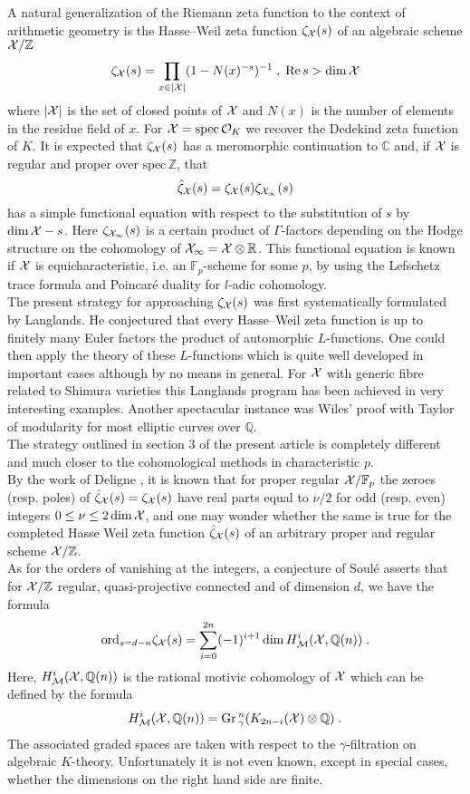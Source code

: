 \documentclass[11pt,leqno]{article}
\newcommand{\C}{{\mathbb{C}}}
\newcommand{\F}{{\mathbb{F}}}
\newcommand{\Q}{{\mathbb{Q}}}
\newcommand{\R}{{\mathbb{R}}}
\newcommand{\Z}{{\mathbb{Z}}}
\newcommand{\ord}{\mathrm{ord}}
\newcommand{\spec}{\mathrm{spec}\,}
\newcommand{\Gr}{\mathrm{Gr}\,}
\newcommand{\RRe}{\mathrm{Re}\,}
\newcommand{\Mh}{{\cal M}}
\newcommand{\Oh}{\mathcal{O}}
\newcommand{\eX}{{\cal X}}
\begin{document}
A natural generalization of the Riemann zeta function to the context of arithmetic geometry is the Hasse--Weil zeta function $\zeta_{\eX} (s)$ of an algebraic scheme $\eX / \Z$
\[
\zeta_{\eX} (s) = \prod_{x \in |\eX|} (1 - N (x)^{-s} )^{-1} \; , \; \RRe s > \dim \eX
\]
where $|\eX |$ is the set of closed points of $\eX$ and $N (x)$ is the number of elements in the residue field of $x$. For $\eX = \spec \Oh_K$ we recover the Dedekind zeta function of $K$. It is expected that $\zeta_{\eX} (s)$ has a meromorphic continuation to $\C$ and, if $\eX$ is regular and proper over $\spec \Z$, that
\[
\hat{\zeta}_{\eX} (s) = \zeta_{\eX} (s) \zeta_{\eX_{\infty}} (s)
\]
has a simple functional equation with respect to the substitution of $s$ by $\dim \eX - s$. Here $\zeta_{\eX_{\infty}} (s)$ is a certain product of $\Gamma$-factors depending on the Hodge structure on the cohomology of $\eX_{\infty} = \eX \otimes \R$. This functional equation is known if $\eX$ is equicharacteristic, i.e. an $\F_p$-scheme for some $p$, by using the Lefschetz trace formula and Poincar\'e duality for $l$-adic cohomology. \\
The present strategy for approaching $\zeta_{\eX} (s)$ was first systematically formulated by Langlands. He conjectured that every Hasse--Weil zeta function is up to finitely many Euler factors the product of automorphic $L$-functions. One could then apply the theory of these $L$-functions which is quite well developed in important cases although by no means in general. For $\eX$ with generic fibre related to Shimura varieties this Langlands program has been achieved in very interesting examples. Another spectacular instance was Wiles' proof with Taylor of modularity for most elliptic curves over $\Q$.\\
The strategy outlined in section 3 of the present article is completely different and much closer to the cohomological methods in characteristic $p$.\\ 
By the work of Deligne \cite{De1}, it is known that for proper regular $\eX / \F_p$ the zeroes (resp. poles) of $\hat{\zeta}_{\eX} (s) = \zeta_{\eX} (s)$ have real parts equal to $\nu / 2$ for odd (resp. even) integers $0 \le \nu \le 2 \dim \eX$, and one may wonder whether the same is true for the completed Hasse Weil zeta function $\hat{\zeta}_{\eX} (s)$ of an arbitrary proper and regular scheme $\eX / \Z$.\\ 
As for the orders of vanishing at the integers, a conjecture of Soul\'e \cite{So} asserts that for $\eX / \Z$ regular, quasi-projective connected and of dimension $d$, we have the formula
\begin{equation}\label{eq:0}
\ord_{s = d-n} \zeta_{\eX} (s) = \sum^{2n}_{i=0} (-1)^{i+1} \dim H^i_{\Mh} (\eX , \Q (n)) \; .
\end{equation}
Here, $H^i_{\Mh} (\eX, \Q (n))$ is the rational motivic cohomology of $\eX$ which can be defined by the formula
\[
H^i_{\Mh} (\eX , \Q (n)) = \Gr^n_{\gamma} (K_{2n-i} (\eX) \otimes \Q) \; .
\]
The associated graded spaces are taken with respect to the $\gamma$-filtration on algebraic $K$-theory. Unfortunately it is not even known, except in special cases, whether the dimensions on the right hand side are finite. 
\end{document}
